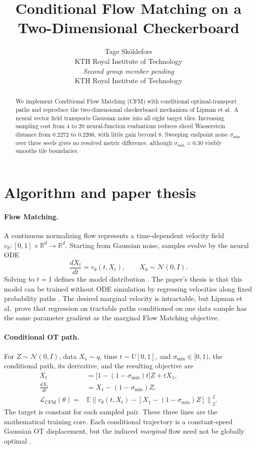 \documentclass{article}
\title{Conditional Flow Matching on a Two-Dimensional Checkerboard}
\author{%
  Tage Sköldefors \\
  KTH Royal Institute of Technology \\
  \And
  \textit{Second group member pending} \\
  KTH Royal Institute of Technology \\
}
\newcommand{\R}{\mathbb{R}}
\newcommand{\E}{\mathbb{E}}
\newcommand{\smin}{\sigma_{\min}}
\begin{document}
\maketitle

\begin{abstract}
We implement Conditional Flow Matching (CFM) with conditional optimal-transport paths and reproduce the two-dimensional checkerboard mechanism of Lipman et al.\ A neural vector field transports Gaussian noise into all eight target tiles. Increasing sampling cost from 4 to 20 neural-function evaluations reduces sliced Wasserstein distance from 0.2272 to 0.2206, with little gain beyond 8. Sweeping endpoint noise $\smin$ over three seeds gives no resolved metric difference, although $\smin=0.30$ visibly smooths tile boundaries.
\end{abstract}

\section{Algorithm and paper thesis}

\paragraph{Flow Matching.}
A continuous normalizing flow represents a time-dependent velocity field $v_\theta:[0,1]\times\R^d\to\R^d$. Starting from Gaussian noise, samples evolve by the neural ODE
\begin{equation}
  \frac{dX_t}{dt}=v_\theta(t,X_t), \qquad X_0\sim\mathcal N(0,I).
  \label{eq:ode}
\end{equation}
Solving to $t=1$ defines the model distribution \cite{chen2018}. The paper's thesis is that this model can be trained without ODE simulation by regressing velocities along fixed probability paths \cite{lipman2023}. The desired marginal velocity is intractable, but Lipman et al.\ prove that regression on tractable paths conditioned on one data sample has the same parameter gradient as the marginal Flow Matching objective.

\paragraph{Conditional OT path.}
For $Z\sim\mathcal N(0,I)$, data $X_1\sim q$, time $t\sim U[0,1]$, and $\smin\in[0,1)$, the conditional path, its derivative, and the resulting objective are
\begin{align}
  X_t &= \bigl[1-(1-\smin)t\bigr]Z+tX_1, \label{eq:path}\\
  \frac{dX_t}{dt} &= X_1-(1-\smin)Z, \label{eq:target}\\
  \mathcal L_{\mathrm{CFM}}(\theta)=
  &\E\left\|v_\theta(t,X_t)-[X_1-(1-\smin)Z]\right\|_2^2.
  \label{eq:cfm}
\end{align}
The target is constant for each sampled pair. These three lines are the mathematical training core. Each conditional trajectory is a constant-speed Gaussian OT displacement, but the induced \emph{marginal} flow need not be globally optimal \cite{lipman2023}.
\end{document}
